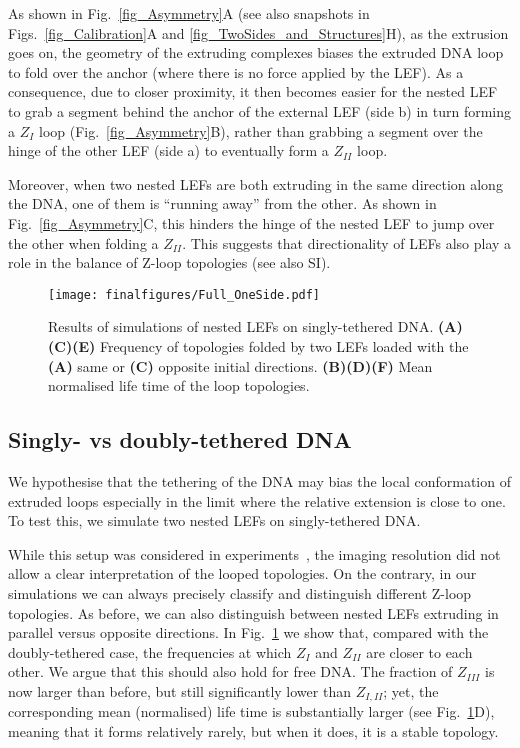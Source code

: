 \documentclass[aps,prl,twocolumn,a4paper,10pt,notitlepage,footinbib,nobalancelastpage,superscriptaddress,showpacs,floatfix]{revtex4-1}%
\begin{document}
As shown in Fig.~\ref{fig_Asymmetry}A (see also snapshots in Figs.~\ref{fig_Calibration}A and \ref{fig_TwoSides_and_Structures}H), as the extrusion goes on, the geometry of the extruding complexes biases the extruded DNA loop to fold over the anchor (where there is no force applied by the LEF). As a consequence, due to closer proximity, it then becomes easier for the nested LEF to grab a segment behind the anchor of the external LEF (side b) in turn forming a $Z_I$ loop (Fig.~\ref{fig_Asymmetry}B), rather than grabbing a segment over the hinge of the other LEF (side a) to eventually form a $Z_{II}$ loop.

Moreover, when two nested LEFs are both extruding in the same direction along the DNA, one of them is ``running away'' from the other. As shown in Fig.~\ref{fig_Asymmetry}C, this hinders the hinge of the nested LEF to jump over the other when folding a $Z_{II}$. This suggests that directionality of LEFs also play a role in the balance of Z-loop topologies (see also SI).

\begin{figure}[t!]	
	\texttt{[image: finalfigures/Full\_OneSide.pdf]}
	\caption{Results of simulations of nested LEFs on singly-tethered DNA. \textbf{(A)(C)(E)} Frequency of topologies folded by two LEFs loaded with the \textbf{(A)} same or \textbf{(C)} opposite initial directions. \textbf{(B)(D)(F)} Mean normalised life time of the loop topologies.}
	\label{fig_OneSide}
\end{figure}

\subsection{Singly- vs doubly-tethered DNA}

We hypothesise that the tethering of the DNA may bias the local conformation of extruded loops especially in the limit where the relative extension is close to one. To test this, we simulate two nested LEFs on singly-tethered DNA. 

While this setup was considered in experiments~\cite{Kim2020}, the imaging resolution did not allow a clear interpretation of the looped topologies.  On the contrary, in our simulations we can always precisely classify and distinguish different Z-loop topologies. As before, we can also distinguish between nested LEFs extruding in parallel versus opposite directions. In Fig.~\ref{fig_OneSide} we show that, compared with the doubly-tethered case, the frequencies at which $Z_I$ and $Z_{II}$ are closer to each other. We argue that this should also hold for free DNA. The fraction of $Z_{III}$ is now larger than before, but still significantly lower than $Z_{I,II}$; yet, the corresponding mean (normalised) life time is substantially larger (see Fig.~\ref{fig_OneSide}D), meaning that it forms relatively rarely, but when it does, it is a stable topology.
\end{document}
